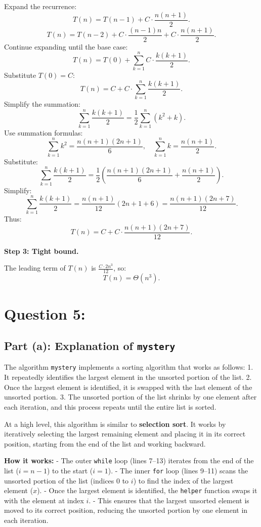 \documentclass{article}
\begin{document}
Expand the recurrence:
\[
T(n) = T(n-1) + C \cdot \frac{n(n+1)}{2}.
\]
\[
T(n) = T(n-2) + C \cdot \frac{(n-1)n}{2} + C \cdot \frac{n(n+1)}{2}.
\]
Continue expanding until the base case:
\[
T(n) = T(0) + \sum_{k=1}^{n} C \cdot \frac{k(k+1)}{2}.
\]
Substitute \( T(0) = C \):
\[
T(n) = C + C \cdot \sum_{k=1}^{n} \frac{k(k+1)}{2}.
\]
Simplify the summation:
\[
\sum_{k=1}^{n} \frac{k(k+1)}{2} = \frac{1}{2} \sum_{k=1}^{n} (k^2 + k).
\]
Use summation formulas:
\[
\sum_{k=1}^{n} k^2 = \frac{n(n+1)(2n+1)}{6}, \quad \sum_{k=1}^{n} k = \frac{n(n+1)}{2}.
\]
Substitute:
\[
\sum_{k=1}^{n} \frac{k(k+1)}{2} = \frac{1}{2} \left( \frac{n(n+1)(2n+1)}{6} + \frac{n(n+1)}{2} \right).
\]
Simplify:
\[
\sum_{k=1}^{n} \frac{k(k+1)}{2} = \frac{n(n+1)}{12} \left( 2n+1 + 6 \right) = \frac{n(n+1)(2n+7)}{12}.
\]
Thus:
\[
T(n) = C + C \cdot \frac{n(n+1)(2n+7)}{12}.
\]

\textbf{Step 3: Tight bound.}

The leading term of \( T(n) \) is \( \frac{C \cdot 2n^3}{12} \), so:
\[
T(n) = \Theta(n^3).
\]
\pagebreak
\section*{Question 5:}
\subsection*{Part (a): Explanation of \texttt{mystery}}

The algorithm \texttt{mystery} implements a sorting algorithm that works as follows:
1. It repeatedly identifies the largest element in the unsorted portion of the list.
2. Once the largest element is identified, it is swapped with the last element of the unsorted portion.
3. The unsorted portion of the list shrinks by one element after each iteration, and this process repeats until the entire list is sorted.

At a high level, this algorithm is similar to \textbf{selection sort}. It works by iteratively selecting the largest remaining element and placing it in its correct position, starting from the end of the list and working backward.

\textbf{How it works:}
- The outer \texttt{while} loop (lines 7–13) iterates from the end of the list (\( i = n - 1 \)) to the start (\( i = 1 \)).
- The inner \texttt{for} loop (lines 9–11) scans the unsorted portion of the list (indices \( 0 \) to \( i \)) to find the index of the largest element (\( x \)).
- Once the largest element is identified, the \texttt{helper} function swaps it with the element at index \( i \).
- This ensures that the largest unsorted element is moved to its correct position, reducing the unsorted portion by one element in each iteration.
\end{document}

